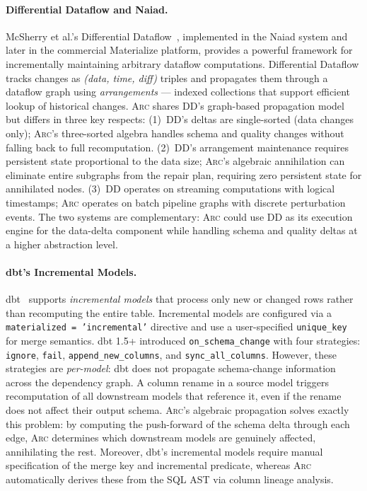 \documentclass[sigplan,screen,nonacm]{acmart}
\newcommand{\arc}{\textsc{Arc}\xspace}
\begin{document}
\paragraph{Differential Dataflow and Naiad.}
McSherry et al.'s Differential Dataflow~\cite{mcsherry2013differential},
implemented in the Naiad system and later in the commercial
Materialize platform, provides a powerful framework for incrementally
maintaining arbitrary dataflow computations.  Differential Dataflow
tracks changes as \emph{(data, time, diff)} triples and propagates
them through a dataflow graph using \emph{arrangements} --- indexed
collections that support efficient lookup of historical changes.
\arc shares DD's graph-based propagation model but differs in three
key respects:
(1)~DD's deltas are single-sorted (data changes only); \arc's
three-sorted algebra handles schema and quality changes without
falling back to full recomputation.
(2)~DD's arrangement maintenance requires persistent state proportional
to the data size; \arc's algebraic annihilation can eliminate entire
subgraphs from the repair plan, requiring zero persistent state for
annihilated nodes.
(3)~DD operates on streaming computations with logical timestamps;
\arc operates on batch pipeline graphs with discrete perturbation
events.  The two systems are complementary: \arc could use DD as its
execution engine for the data-delta component while handling schema
and quality deltas at a higher abstraction level.

\paragraph{dbt's Incremental Models.}
dbt~\cite{dbt2023} supports \emph{incremental models} that process
only new or changed rows rather than recomputing the entire table.
Incremental models are configured via a \texttt{materialized =
'incremental'} directive and use a user-specified
\texttt{unique\_key} for merge semantics.  dbt 1.5+ introduced
\texttt{on\_schema\_change} with four strategies: \texttt{ignore},
\texttt{fail}, \texttt{append\_new\_columns}, and \texttt{sync\_all\_columns}.
However, these strategies are \emph{per-model}: dbt does not propagate
schema-change information across the dependency graph.  A column rename
in a source model triggers recomputation of all downstream models that
reference it, even if the rename does not affect their output schema.
\arc's algebraic propagation solves exactly this problem: by computing
the push-forward of the schema delta through each edge, \arc
determines which downstream models are genuinely affected, annihilating
the rest.  Moreover, dbt's incremental models require manual
specification of the merge key and incremental predicate, whereas
\arc automatically derives these from the SQL AST via column lineage
analysis.
\end{document}
